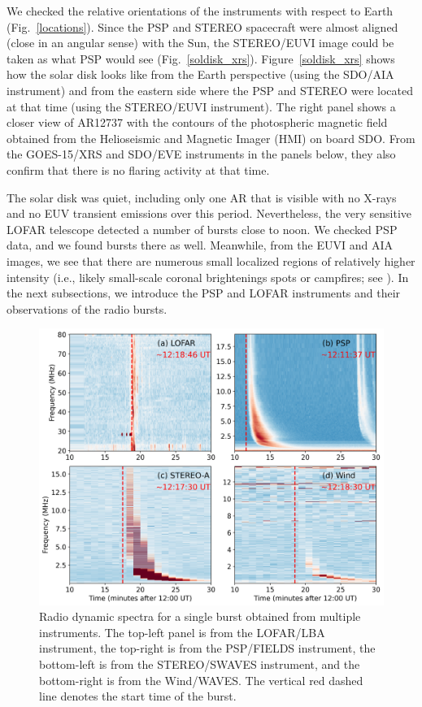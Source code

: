 We checked the relative orientations of the instruments with respect to Earth (Fig.~\ref{locations}). Since the PSP and STEREO spacecraft were almost aligned (close in an angular sense) with the Sun, the STEREO/EUVI image could be taken as what PSP would see (Fig.~\ref{soldisk_xrs}).
Figure~\ref{soldisk_xrs} shows how the solar disk looks like from the Earth perspective (using the SDO/AIA instrument) and from the eastern side where the PSP and STEREO were located at that time (using the STEREO/EUVI instrument).
The right panel shows a closer view of AR12737 with the contours of the photospheric magnetic field obtained from the Helioseismic and Magnetic Imager (HMI) on board SDO.
From the GOES-15/XRS and SDO/EVE instruments in the panels below, they also confirm that there is no flaring activity at that time.

The solar disk was quiet, including only one AR that is visible with no X-rays and no EUV transient emissions over this period.
Nevertheless, the very sensitive LOFAR telescope detected a number of bursts close to noon. We checked PSP data, and we found bursts there as well.
Meanwhile, from the EUVI and AIA images, we see that there are numerous small localized regions of relatively higher intensity (i.e., likely small-scale coronal brightenings spots or campfires; see \cite{young_2018, madjarska_2019, berghmans_2021}).
In the next subsections, we introduce the PSP and LOFAR instruments and their observations of the radio bursts.

\begin{figure}
\centering
\includegraphics[width=0.9\hsize]{chapter3/figs/all_dyspec.png}
\caption{Radio dynamic spectra for a single burst obtained from multiple instruments. The top-left panel is from the LOFAR/LBA instrument, the top-right is from the PSP/FIELDS instrument, the bottom-left is from the STEREO/SWAVES instrument, and the bottom-right is from the Wind/WAVES. The vertical red dashed line denotes the start time of the burst.}
\label{fig_alldyspec}
\end{figure}

